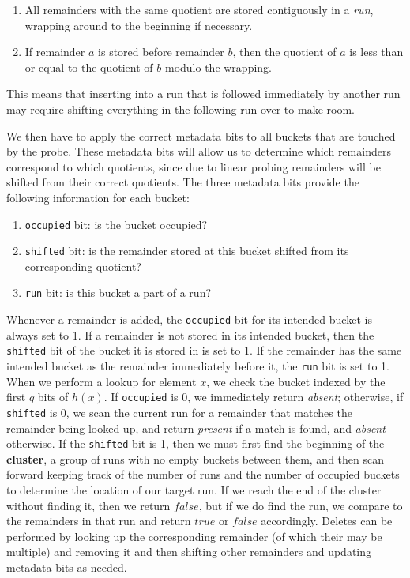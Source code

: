 \documentclass[../paper.tex]{subfiles}
\begin{document}
\begin{enumerate}
    \item All remainders with the same quotient are stored contiguously in a \textit{run}, wrapping around to the beginning if necessary.
    \item If remainder $a$ is stored before remainder $b$, then the quotient of $a$ is less than or equal to the quotient of $b$ modulo the wrapping.
\end{enumerate}

This means that inserting into a run that is followed immediately by another run may require
shifting everything in the following run over to make room.

We then have to apply the correct metadata bits to all buckets that are touched by the probe. These metadata
bits will allow us to determine which remainders correspond to which quotients,
since due to linear probing remainders will be shifted from their correct quotients.
The three metadata bits provide the following information for each bucket:

\begin{enumerate}
    \item \texttt{occupied} bit: is the bucket occupied?
    \item \texttt{shifted} bit: is the remainder stored at this bucket shifted from its corresponding quotient?
    \item \texttt{run} bit: is this bucket a part of a run?
\end{enumerate}

    Whenever a remainder is
    added, the \texttt{occupied} bit for its intended bucket is always set to 1.  If
    a remainder is not stored in its intended bucket, then the \texttt{shifted} bit
    of the bucket it is stored in is set to 1.  If the remainder has the same
    intended bucket as the remainder immediately before it, the \texttt{run} bit is set to 1.  When we
    perform a lookup for element $x$, we check the bucket indexed by the first
    $q$ bits of $h(x)$.  If \texttt{occupied} is 0, we immediately return
    \textit{absent}; otherwise, if \texttt{shifted} is 0, we scan the current run for a remainder
    that matches the remainder being looked up, and return \textit{present} if a match is found,
    and \textit{absent} otherwise.
    If the \texttt{shifted} bit is 1, then we must
    first find the beginning of the {\bf cluster}, a group of runs with no
    empty buckets between them, and then scan forward keeping track of the
    number of runs and the number of occupied buckets to determine the location
    of our target run.  If we reach the end of the cluster without finding it,
    then we return $false$, but if we do find the run, we compare to the
    remainders in that run and return $true$ or $false$ accordingly.  Deletes
    can be performed by looking up the corresponding remainder (of which their
    may be multiple) and removing it and then shifting other remainders and
    updating metadata bits as needed.
\end{document}
